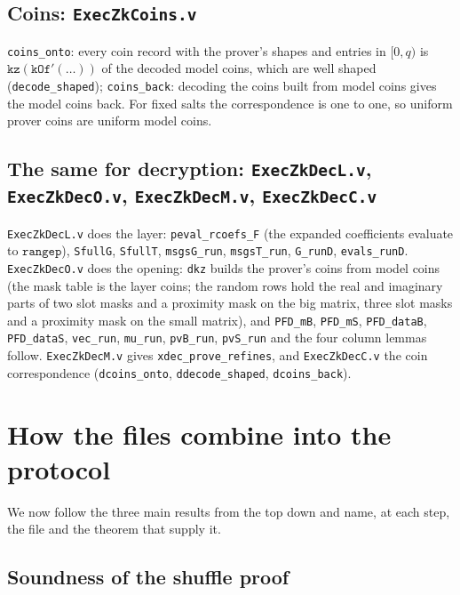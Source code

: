 \documentclass[11pt,a4paper]{article}
\theoremstyle{definition}
\theoremstyle{plain}
\begin{document}
\subsection{Coins: \texttt{ExecZkCoins.v}}

\texttt{coins\_onto}: every coin record with the prover's shapes and entries in $[0,q)$ is
$\mathtt{kz}(\mathtt{kOf}'(\dots))$ of the decoded model coins, which are well shaped
(\texttt{decode\_shaped}); \texttt{coins\_back}: decoding the coins built from model coins gives the
model coins back. For fixed salts the correspondence is one to one, so uniform prover coins are
uniform model coins.

\subsection{The same for decryption: \texttt{ExecZkDecL.v}, \texttt{ExecZkDecO.v}, \texttt{ExecZkDecM.v}, \texttt{ExecZkDecC.v}}

\texttt{ExecZkDecL.v} does the layer: \texttt{peval\_rcoefs\_F} (the expanded coefficients evaluate to
$\mathtt{rangep}$), \texttt{SfullG}, \texttt{SfullT}, \texttt{msgsG\_run}, \texttt{msgsT\_run}, \texttt{G\_runD},
\texttt{evals\_runD}. \texttt{ExecZkDecO.v} does the opening: \texttt{dkz} builds the prover's coins from
model coins (the mask table is the layer coins; the random rows hold the real and imaginary parts
of two slot masks and a proximity mask on the big matrix, three slot masks and a proximity mask on
the small matrix), and \texttt{PFD\_mB}, \texttt{PFD\_mS}, \texttt{PFD\_dataB}, \texttt{PFD\_dataS},
\texttt{vec\_run}, \texttt{mu\_run}, \texttt{pvB\_run}, \texttt{pvS\_run} and the four column lemmas follow.
\texttt{ExecZkDecM.v} gives \texttt{xdec\_prove\_refines}, and \texttt{ExecZkDecC.v} the coin
correspondence (\texttt{dcoins\_onto}, \texttt{ddecode\_shaped}, \texttt{dcoins\_back}).

\section{How the files combine into the protocol}
\label{sec:fm-together}

We now follow the three main results from the top down and name, at each step, the file and the
theorem that supply it.

\subsection{Soundness of the shuffle proof}
\end{document}
